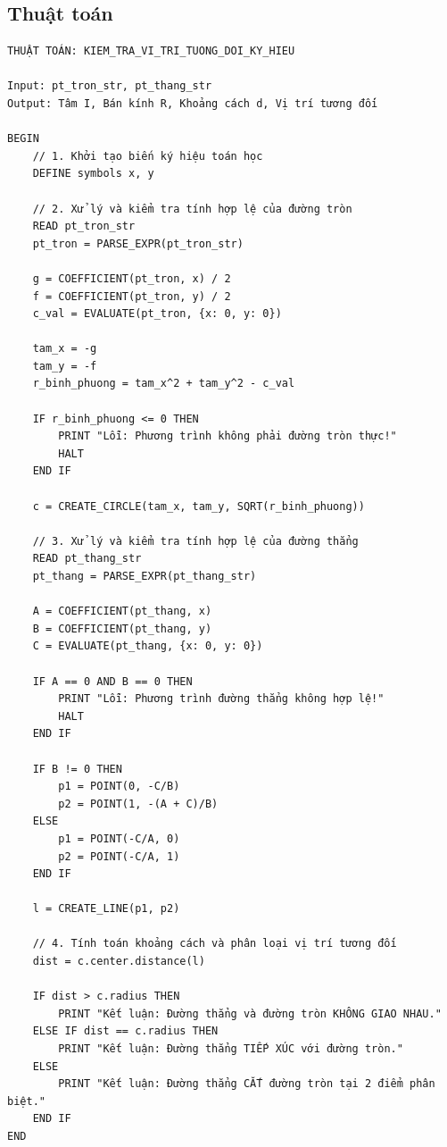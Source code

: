 \documentclass[12pt,a4paper]{article}
\begin{document}
\newpage

\subsection{ Thuật toán }

\small
\begin{verbatim}
THUẬT TOÁN: KIEM_TRA_VI_TRI_TUONG_DOI_KY_HIEU

Input: pt_tron_str, pt_thang_str
Output: Tâm I, Bán kính R, Khoảng cách d, Vị trí tương đối

BEGIN
    // 1. Khởi tạo biến ký hiệu toán học
    DEFINE symbols x, y

    // 2. Xử lý và kiểm tra tính hợp lệ của đường tròn
    READ pt_tron_str
    pt_tron = PARSE_EXPR(pt_tron_str)
    
    g = COEFFICIENT(pt_tron, x) / 2
    f = COEFFICIENT(pt_tron, y) / 2
    c_val = EVALUATE(pt_tron, {x: 0, y: 0})
    
    tam_x = -g
    tam_y = -f
    r_binh_phuong = tam_x^2 + tam_y^2 - c_val
    
    IF r_binh_phuong <= 0 THEN
        PRINT "Lỗi: Phương trình không phải đường tròn thực!"
        HALT
    END IF
    
    c = CREATE_CIRCLE(tam_x, tam_y, SQRT(r_binh_phuong))

    // 3. Xử lý và kiểm tra tính hợp lệ của đường thẳng
    READ pt_thang_str
    pt_thang = PARSE_EXPR(pt_thang_str)
    
    A = COEFFICIENT(pt_thang, x)
    B = COEFFICIENT(pt_thang, y)
    C = EVALUATE(pt_thang, {x: 0, y: 0})
    
    IF A == 0 AND B == 0 THEN
        PRINT "Lỗi: Phương trình đường thẳng không hợp lệ!"
        HALT
    END IF
    
    IF B != 0 THEN
        p1 = POINT(0, -C/B)
        p2 = POINT(1, -(A + C)/B)
    ELSE
        p1 = POINT(-C/A, 0)
        p2 = POINT(-C/A, 1)
    END IF
    
    l = CREATE_LINE(p1, p2)

    // 4. Tính toán khoảng cách và phân loại vị trí tương đối
    dist = c.center.distance(l)
    
    IF dist > c.radius THEN
        PRINT "Kết luận: Đường thẳng và đường tròn KHÔNG GIAO NHAU."
    ELSE IF dist == c.radius THEN
        PRINT "Kết luận: Đường thẳng TIẾP XÚC với đường tròn."
    ELSE
        PRINT "Kết luận: Đường thẳng CẮT đường tròn tại 2 điểm phân biệt."
    END IF
END
\end{verbatim}
\end{document}

